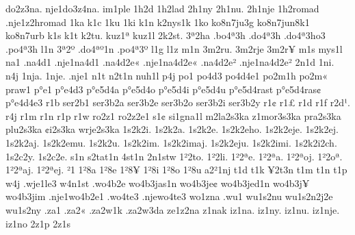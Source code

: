 {do2z3na.
nje1do3z4na.
im1ple
1h2d
1h2lad
2h1ny
2h1nu.
2h1nje
1h2romad
.nje1z2hromad
1ka
k1c
1ku
1ki
k1n
k2nys1k
1ko
ko8n7ju3g
ko8n7jun8k1
ko8n7urb
k1s
k1t
k2tu.
kuz1^^aa
kuz1l
2k2st.
3^^aa2ha
.bo4^^aa3h
.do4^^aa3h
.do4^^aa3ho3
.po4^^aa3h
l1n
3^^aa2^^ba
.do4^^aa^^ba1n
.po4^^aa3^^ba
l1g
l1z
m1n
3m2ru.
3m2rje
3m2r^^a5
m1s
mys1l
na1
.na4d1
.nje1na4d1
.na4d2e^^ab
.nje1na4d2e^^ab
.na4d2e^^b2
.nje1na4d2e^^b2
2n1d
1ni.
n4j
1nja.
1nje.
.nje1
n1t
n2t1n
nuh1l
p4j
po1
po4d3
po4d4e1
po2m1h
po2m^^ab
praw1
p^^b0e1
p^^b0e4d3
p^^b0e5d4a
p^^b0e5d4o
p^^b0e5d4i
p^^b0e5d4u
p^^b0e5d4rast
p^^b0e5d4ras^^a2
p^^b0e4d4e3
r1b
ser2b1
ser3b2a
ser3b2e
ser3b2o
ser3b2i
ser3b2y
r1^^a2
r1^^a3
r1d
r1f
r2d^^b9.
r4j
r1m
r1n
r1p
r1w
ro2z1
ro2z2e1
s1^^a2
si1gna1l
m2la2s3ka
z1mor3s3ka
pra2s3ka
plu2s3ka
^^a2i2s3ka
wrje2s3ka
1s2k2i.
1s2k2a.
1s2k2e.
1s2k2eho.
1s2k2eje.
1s2k2ej.
1s2k2aj.
1s2k2emu.
1s2k2u.
1s2k2im.
1s2k2imaj.
1s2k2eju.
1s2k2imi.
1s2k2i2ch.
1s2c2y.
1s2c2e.
s1n
s2tat1n
4st1n
2n1stw
1^^b22to.
1^^b22li.
1^^b22^^aae.
1^^b22^^aaa.
1^^b22^^aaoj.
1^^b22o^^aa.
1^^b22^^aaaj.
1^^b22^^aaej.
^^b21
1^^b28a
1^^b28e
1^^b28^^a5
1^^b28i
1^^b28o
1^^b28u
a2^^b21nj
t1d
t1k
^^a52t3n
t1m
t1n
t1p
w4j
.wje1le3
w4n1st
.wo4b2e
wo4b3jas1n
wo4b3je^^a2
wo4b3jed1n
wo4b3j^^a5
wo4b3jim
.nje1wo4b2e1
.wo4te3
.njewo4te3
wo1zna
.wu1
wu1s2nu
wu1s2n2j2e
wu1s2ny
.za1
.za2^^ab
.za2w1k
.za2w3da
ze1z2na
z1nak
iz1na.
iz1ny.
iz1nu.
iz1nje.
iz1no
2z1p
2z1s
}
\egroup
\endinput
